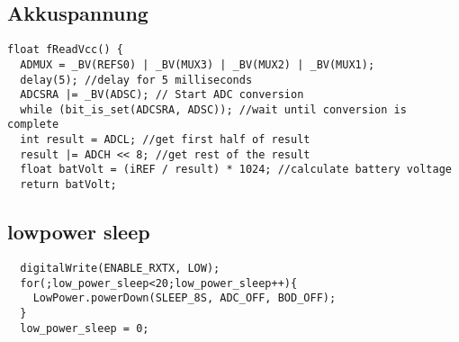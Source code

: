 \subsection{Akkuspannung}
\label{satelit spannung}
\begin{verbatim}
float fReadVcc() {
  ADMUX = _BV(REFS0) | _BV(MUX3) | _BV(MUX2) | _BV(MUX1);
  delay(5); //delay for 5 milliseconds
  ADCSRA |= _BV(ADSC); // Start ADC conversion
  while (bit_is_set(ADCSRA, ADSC)); //wait until conversion is complete
  int result = ADCL; //get first half of result
  result |= ADCH << 8; //get rest of the result
  float batVolt = (iREF / result) * 1024; //calculate battery voltage
  return batVolt;
\end{verbatim}
\subsection{lowpower sleep}
\label{lowpowersleep}
\begin{verbatim}
  digitalWrite(ENABLE_RXTX, LOW);
  for(;low_power_sleep<20;low_power_sleep++){
    LowPower.powerDown(SLEEP_8S, ADC_OFF, BOD_OFF);
  }
  low_power_sleep = 0;
\end{verbatim}